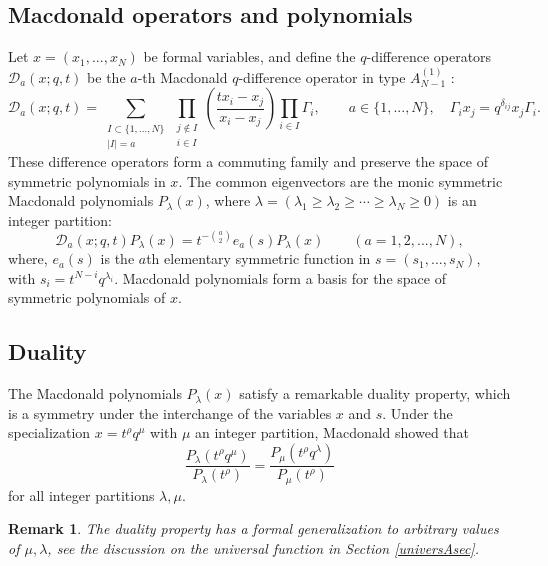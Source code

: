 \documentclass[12pt]{amsart}
\newtheorem{remark}[thm]{Remark}
\newcommand{\D}{{\mathcal{D}}}
\numberwithin{equation}{section}
\begin{document}
\subsection{Macdonald operators and polynomials}\label{sec:21} Let $x=(x_1,...,x_N)$ be formal variables, and define the $q$-difference operators
$\D_a(x; q,t)$  be the  $a$-th Macdonald $q$-difference operator in type $A^{(1)}_{N-1}$ \cite{macdo}: 
\begin{equation}\label{DA}
\D_a(x;q,t) = \sum_{\substack{ I\subset\{1,...,N\}\\ |I|=a}} \prod_{\substack{j\notin I\\ i\in I}}\left(
\frac{t x_i -x_j}{x_i-x_j} \right)\prod_{i\in I} \Gamma_i, \qquad a\in\{1,...,N\}, \quad \Gamma_i x_j = q^{\delta_{ij}} x_j \Gamma_i.
\end{equation}
These difference operators form a commuting family and preserve the space of symmetric polynomials in $x$. 
%
The common eigenvectors are the monic symmetric Macdonald polynomials $P_\lambda(x)$, where $\lambda=(\lambda_1\geq \lambda_2\geq \cdots \geq \lambda_N\geq 0)$ is an integer partition:
\begin{equation}\label{eigenvalue}
\D_a(x;q,t) P_\lambda(x) = t^{-{a\choose2}}e_a(s) P_\lambda(x)\qquad (a=1,2,...,N),
\end{equation}
where, $e_a(s)$ is the $a$th elementary symmetric function in $s=(s_1,...,s_N)$, with $s_i = t^{N-i} q^{\lambda_i}$. Macdonald polynomials form a basis for the space of symmetric polynomials of $x$.

%
%
%
%
%
%
%
%
%
%
%
%
%
%
%
%
%
%

\subsection{Duality}\label{Duality}
The Macdonald polynomials $P_\lambda(x)$ satisfy a remarkable duality property, which is a symmetry under the interchange of the variables $x$ and $s$. Under the specialization $x=t^\rho q^\mu$ with $\mu$ an integer partition,  Macdonald showed that \cite{macdo}
\begin{equation}\label{dualpoA}
\frac{P_\lambda(t^\rho q^\mu)}{P_\lambda(t^\rho)}=\frac{P_\mu(t^\rho q^\lambda)}{P_\mu(t^\rho)}
\end{equation}
for all integer partitions $\lambda,\mu$. 
\begin{remark} The duality property has a formal generalization to arbitrary values of $\mu,\lambda$, see the discussion on the universal function in Section \ref{universAsec}.
\end{remark}
\end{document}
